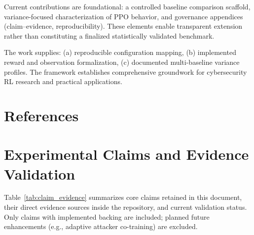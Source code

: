 \documentclass[12pt,twoside]{article}
\theoremstyle{definition}
\theoremstyle{plain}
\begin{document}
Current contributions are foundational: a controlled baseline comparison scaffold, variance-focused characterization of PPO behavior, and governance appendices (claim–evidence, reproducibility). These elements enable transparent extension rather than constituting a finalized statistically validated benchmark.

The work supplies: (a) reproducible configuration mapping, (b) implemented reward and observation formalization, (c) documented multi-baseline variance profiles. The framework establishes comprehensive groundwork for cybersecurity RL research and practical applications.


\section{References}




\appendix

\section{Experimental Claims and Evidence Validation}

Table~\ref{tab:claim_evidence} summarizes core claims retained in this document, their direct evidence sources inside the repository, and current validation status. Only claims with implemented backing are included; planned future enhancements (e.g., adaptive attacker co-training) are excluded.
\end{document}
